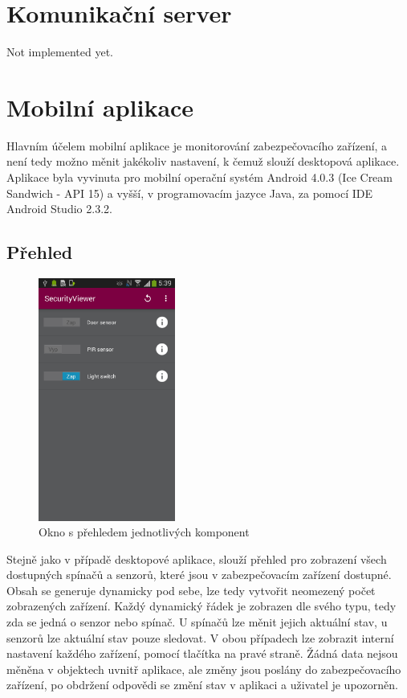 \documentclass[FM,DP]{tulthesis}  %
\begin{document}

\chapter{Komunikační server}
Not implemented yet.


\chapter{Mobilní aplikace}
Hlavním účelem mobilní aplikace je monitorování zabezpečovacího zařízení, a není tedy možno měnit jakékoliv nastavení, k čemuž slouží desktopová aplikace. Aplikace byla vyvinuta pro mobilní operační systém Android 4.0.3 (Ice Cream Sandwich - API 15) a vyšší, v programovacím jazyce Java, za pomocí IDE Android Studio 2.3.2.

\section{Přehled}
\begin{figure}[H]
\begin{center}
\includegraphics[width=0.4\textwidth]{images/app1.png}
\caption{Okno s přehledem jednotlivých komponent}
\label{image}
\end{center}
\end{figure}

Stejně jako v případě desktopové aplikace, slouží přehled pro zobrazení všech dostupných spínačů a senzorů, které jsou v zabezpečovacím zařízení dostupné. Obsah se generuje dynamicky pod sebe, lze tedy vytvořit neomezený počet zobrazených zařízení. Každý dynamický řádek je zobrazen dle svého typu, tedy zda se jedná o senzor nebo spínač. U spínačů lze měnit jejich aktuální stav, u senzorů lze aktuální stav pouze sledovat. V obou případech lze zobrazit interní nastavení každého zařízení, pomocí tlačítka na pravé straně. Žádná data nejsou měněna v objektech uvnitř aplikace, ale změny jsou poslány do zabezpečovacího zařízení, po obdržení odpovědi se změní stav v aplikaci a uživatel je upozorněn.
\end{document}

